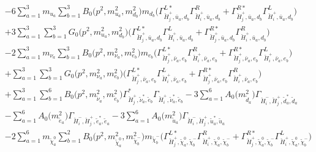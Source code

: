 \begin{itemize}
\begin{align}
 &-6 \sum_{a=1}^{3}m_{u_{{a}}} \sum_{b=1}^{3}{B_0\Big(p^{2},m^2_{u_{{a}}},m^2_{d_{{b}}}\Big)} m_{d_{{b}}} \Big({\Gamma^{L*}_{\check{H}^+_{{j}},\bar{u}_{{a}},d_{{b}}}} {\Gamma^R_{\check{H}^+_{{i}},\bar{u}_{{a}},d_{{b}}}}  + {\Gamma^{R*}_{\check{H}^+_{{j}},\bar{u}_{{a}},d_{{b}}}} {\Gamma^L_{\check{H}^+_{{i}},\bar{u}_{{a}},d_{{b}}}} \Big)  \nonumber \\ 
 &+3 \sum_{a=1}^{3}\sum_{b=1}^{3}{G_0\Big(p^{2},m^2_{u_{{a}}},m^2_{d_{{b}}}\Big)} \Big({\Gamma^{L*}_{\check{H}^+_{{j}},\bar{u}_{{a}},d_{{b}}}} {\Gamma^L_{\check{H}^+_{{i}},\bar{u}_{{a}},d_{{b}}}}  + {\Gamma^{R*}_{\check{H}^+_{{j}},\bar{u}_{{a}},d_{{b}}}} {\Gamma^R_{\check{H}^+_{{i}},\bar{u}_{{a}},d_{{b}}}} \Big) \nonumber \\ 
 &-2 \sum_{a=1}^{3}m_{\nu_{{a}}} \sum_{b=1}^{3}{B_0\Big(p^{2},m^2_{\nu_{{a}}},m^2_{e_{{b}}}\Big)} m_{e_{{b}}} \Big({\Gamma^{L*}_{\check{H}^+_{{j}},\bar{\nu}_{{a}},e_{{b}}}} {\Gamma^R_{\check{H}^+_{{i}},\bar{\nu}_{{a}},e_{{b}}}}  + {\Gamma^{R*}_{\check{H}^+_{{j}},\bar{\nu}_{{a}},e_{{b}}}} {\Gamma^L_{\check{H}^+_{{i}},\bar{\nu}_{{a}},e_{{b}}}} \Big)  \nonumber \\ 
 &+\sum_{a=1}^{3}\sum_{b=1}^{3}{G_0\Big(p^{2},m^2_{\nu_{{a}}},m^2_{e_{{b}}}\Big)} \Big({\Gamma^{L*}_{\check{H}^+_{{j}},\bar{\nu}_{{a}},e_{{b}}}} {\Gamma^L_{\check{H}^+_{{i}},\bar{\nu}_{{a}},e_{{b}}}}  + {\Gamma^{R*}_{\check{H}^+_{{j}},\bar{\nu}_{{a}},e_{{b}}}} {\Gamma^R_{\check{H}^+_{{i}},\bar{\nu}_{{a}},e_{{b}}}} \Big)\nonumber \\ 
 &+\sum_{a=1}^{3}\sum_{b=1}^{6}{B_0\Big(p^{2},m^2_{\tilde{\nu}_{{a}}},m^2_{\tilde{e}_{{b}}}\Big)} {\Gamma^*_{\check{H}^+_{{j}},\tilde{\nu}^*_{{a}},\tilde{e}_{{b}}}} {\Gamma_{\check{H}^+_{{i}},\tilde{\nu}^*_{{a}},\tilde{e}_{{b}}}} -3 \sum_{a=1}^{6}{A_0\Big(m^2_{\tilde{d}_{{a}}}\Big)} {\Gamma_{\check{H}^-_{{i}},\check{H}^+_{{j}},\tilde{d}^*_{{a}},\tilde{d}_{{a}}}}  \nonumber \\ 
 &- \sum_{a=1}^{6}{A_0\Big(m^2_{\tilde{e}_{{a}}}\Big)} {\Gamma_{\check{H}^-_{{i}},\check{H}^+_{{j}},\tilde{e}^*_{{a}},\tilde{e}_{{a}}}}  -3 \sum_{a=1}^{6}{A_0\Big(m^2_{\tilde{u}_{{a}}}\Big)} {\Gamma_{\check{H}^-_{{i}},\check{H}^+_{{j}},\tilde{u}^*_{{a}},\tilde{u}_{{a}}}}  \nonumber \\ 
 &-2 \sum_{a=1}^{6}m_{\tilde{\chi}^0_{{a}}} \sum_{b=1}^{2}{B_0\Big(p^{2},m^2_{\tilde{\chi}^0_{{a}}},m^2_{\tilde{\chi}^-_{{b}}}\Big)} m_{\tilde{\chi}^-_{{b}}} \Big({\Gamma^{L*}_{\check{H}^+_{{j}},\tilde{\chi}^0_{{a}},\tilde{\chi}^-_{{b}}}} {\Gamma^R_{\check{H}^+_{{i}},\tilde{\chi}^0_{{a}},\tilde{\chi}^-_{{b}}}}  + {\Gamma^{R*}_{\check{H}^+_{{j}},\tilde{\chi}^0_{{a}},\tilde{\chi}^-_{{b}}}} {\Gamma^L_{\check{H}^+_{{i}},\tilde{\chi}^0_{{a}},\tilde{\chi}^-_{{b}}}} \Big)  \nonumber \\ 

\end{align}
\end{itemize}
